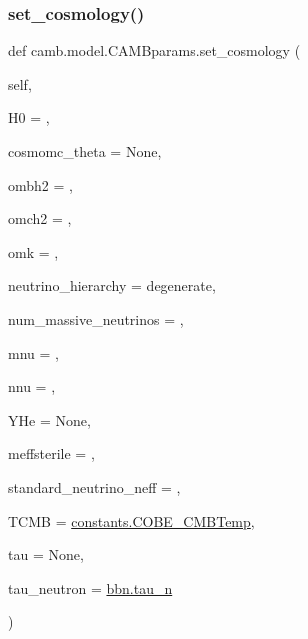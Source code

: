 \subsubsection{\texorpdfstring{set\+\_\+cosmology()}{set\_cosmology()}}
{\footnotesize\ttfamily def camb.\+model.\+C\+A\+M\+Bparams.\+set\+\_\+cosmology (\begin{DoxyParamCaption}\item[{}]{self,  }\item[{}]{H0 = {},  }\item[{}]{cosmomc\+\_\+theta = {\ttfamily None},  }\item[{}]{ombh2 = {},  }\item[{}]{omch2 = {},  }\item[{}]{omk = {},  }\item[{}]{neutrino\+\_\+hierarchy = {\ttfamily \textquotesingle{}degenerate\textquotesingle{}},  }\item[{}]{num\+\_\+massive\+\_\+neutrinos = {},  }\item[{}]{mnu = {},  }\item[{}]{nnu = {},  }\item[{}]{Y\+He = {\ttfamily None},  }\item[{}]{meffsterile = {},  }\item[{}]{standard\+\_\+neutrino\+\_\+neff = {},  }\item[{}]{T\+C\+MB = {\ttfamily \mbox{\hyperlink{namespacecamb_1_1constants_a021083fae909f391c578458f5ddafc75}{constants.\+C\+O\+B\+E\+\_\+\+C\+M\+B\+Temp}}},  }\item[{}]{tau = {\ttfamily None},  }\item[{}]{tau\+\_\+neutron = {\ttfamily \mbox{\hyperlink{namespacecamb_1_1bbn_ae95abe1177100ca3b8cfb59cf9e379be}{bbn.\+tau\+\_\+n}}} }\end{DoxyParamCaption})}

